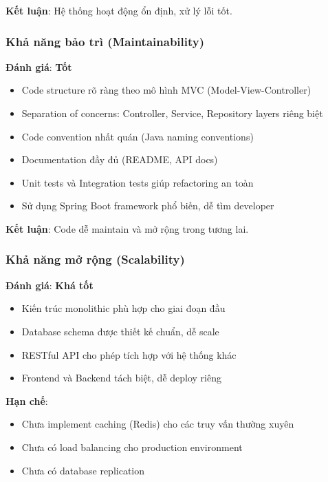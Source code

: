 \textbf{Kết luận}: Hệ thống hoạt động ổn định, xử lý lỗi tốt.

\subsubsection{Khả năng bảo trì (Maintainability)}

\textbf{Đánh giá}: \textbf{Tốt}

\begin{itemize}
    \item Code structure rõ ràng theo mô hình MVC (Model-View-Controller)
    \item Separation of concerns: Controller, Service, Repository layers riêng biệt
    \item Code convention nhất quán (Java naming conventions)
    \item Documentation đầy đủ (README, API docs)
    \item Unit tests và Integration tests giúp refactoring an toàn
    \item Sử dụng Spring Boot framework phổ biến, dễ tìm developer
\end{itemize}

\textbf{Kết luận}: Code dễ maintain và mở rộng trong tương lai.

\subsubsection{Khả năng mở rộng (Scalability)}

\textbf{Đánh giá}: \textbf{Khá tốt}

\begin{itemize}
    \item Kiến trúc monolithic phù hợp cho giai đoạn đầu
    \item Database schema được thiết kế chuẩn, dễ scale
    \item RESTful API cho phép tích hợp với hệ thống khác
    \item Frontend và Backend tách biệt, dễ deploy riêng
\end{itemize}

\textbf{Hạn chế}:
\begin{itemize}
    \item Chưa implement caching (Redis) cho các truy vấn thường xuyên
    \item Chưa có load balancing cho production environment
    \item Chưa có database replication
\end{itemize}

